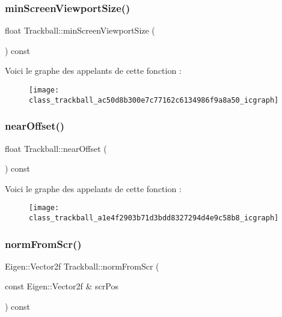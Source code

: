 \subsubsection{\texorpdfstring{min\+Screen\+Viewport\+Size()}{minScreenViewportSize()}}
{\footnotesize\ttfamily float Trackball\+::min\+Screen\+Viewport\+Size (\begin{DoxyParamCaption}{ }\end{DoxyParamCaption}) const}

Voici le graphe des appelants de cette fonction \+:
\nopagebreak
\begin{figure}[H]
\begin{center}
\leavevmode
\texttt{[image: class\_trackball\_ac50d8b300e7c77162c6134986f9a8a50\_icgraph]}
\end{center}
\end{figure}
\mbox{\label{class_trackball_a1e4f2903b71d3bdd8327294d4e9c58b8}} 
\subsubsection{\texorpdfstring{near\+Offset()}{nearOffset()}}
{\footnotesize\ttfamily float Trackball\+::near\+Offset (\begin{DoxyParamCaption}{ }\end{DoxyParamCaption}) const}

Voici le graphe des appelants de cette fonction \+:
\nopagebreak
\begin{figure}[H]
\begin{center}
\leavevmode
\texttt{[image: class\_trackball\_a1e4f2903b71d3bdd8327294d4e9c58b8\_icgraph]}
\end{center}
\end{figure}
\mbox{\label{class_trackball_a84d3a79355d75d73e72ca10f5d469728}} 
\subsubsection{\texorpdfstring{norm\+From\+Scr()}{normFromScr()}}
{\footnotesize\ttfamily Eigen\+::\+Vector2f Trackball\+::norm\+From\+Scr (\begin{DoxyParamCaption}\item[{const Eigen\+::\+Vector2f \&}]{scr\+Pos }\end{DoxyParamCaption}) const\hspace{0.3cm}{\ttfamily [private]}}

